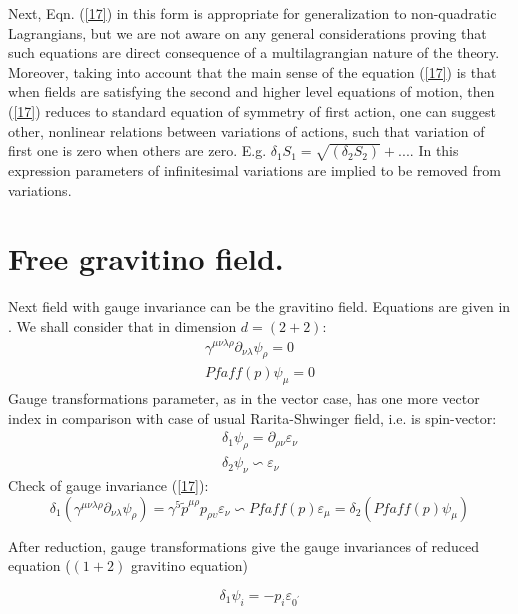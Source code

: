 \documentclass[a4paper,12pt]{article}
\begin{document}
Next,  Eqn. (\ref{17}) in this form is appropriate for
generalization to non-quadratic Lagrangians, but we are not aware
on any general considerations proving that such equations are
direct consequence of a multilagrangian nature of the theory.
Moreover, taking into account that the main sense of the equation
(\ref {17}) is that when fields are satisfying the second and
higher level equations of motion, then (\ref {17}) reduces to
standard equation of symmetry of first action, one can suggest
other, nonlinear relations between variations of actions, such
that variation of first one is zero when others are zero. E.g.
$\delta _1 S_1  = \sqrt{(\delta _2 S_2 )} + ...$. In this
expression parameters of infinitesimal variations are implied to
be removed from variations.

\bigskip

\section{Free gravitino field.}
    Next field with gauge invariance can be the gravitino field.
    Equations are given in \cite{Man1}.
We shall consider that in dimension  $d=(2+2)$:
\begin{eqnarray}
\gamma ^{\mu \nu \lambda \rho }\partial _{\nu \lambda }\psi _{\rho}=0\\
 Pfaff(p)\psi _{\mu }=0
\end{eqnarray}
Gauge transformations parameter, as in the vector case, has one
more vector index in comparison with case of usual Rarita-Shwinger
field, i.e. is spin-vector:
\begin{eqnarray}
\delta _{1}\psi _{\rho }=\partial _{\rho \nu }\varepsilon _{\nu
}\\
\delta _{2}\psi _{\nu }\backsim \varepsilon _{\nu }
\end{eqnarray}
Check of gauge invariance (\ref{17}):
\begin{equation}
\delta _{1}(\gamma ^{\mu \nu \lambda \rho }\partial _{\nu \lambda
}\psi _{\rho })=\gamma ^{5}\widetilde{p}^{\mu \rho }p_{\rho
\upsilon }\varepsilon _{\nu }\backsim Pfaff(p)\varepsilon _{\mu
}=\delta _{2}(Pfaff(p)\psi _{\mu })
\end{equation}

After reduction, gauge transformations give the gauge invariances
of reduced equation ($(1+2)$ gravitino equation)

\begin{equation}
\delta _{1}\psi _{i}=-p_{i}\varepsilon _{0^{\prime }}
\end{equation}
\end{document}
